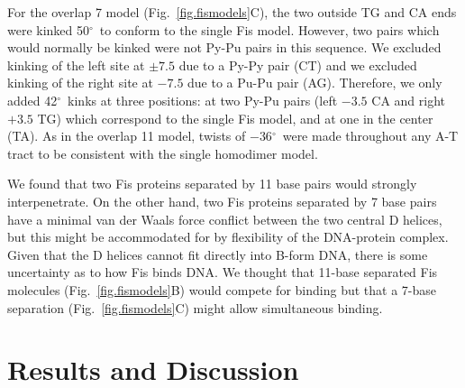 \documentclass[doublespacing]{narfront}
\newcommand{\fig}[1]{Fig.~\ref{#1}} %
\newcommand{\degrees}{${}^{\circ}$}
\newcommand{\latex}[1]{#1} %
\newcommand{\html}[1]{{ }} %
\begin{document}

For the overlap 7 model
\html{(figure 3),}%
\latex{(\fig{fig.fismodels}C),}
the two outside TG and CA ends were kinked
50\degrees\ to conform to the single Fis model.  However, two pairs which would
normally be kinked were not Py-Pu pairs in this sequence.  We excluded kinking
of the left site at $\pm 7.5$ due to a Py-Py pair (CT) and we excluded kinking of
the right site at $-7.5$ due to a Pu-Pu pair (AG).
Therefore, we only added
42\degrees\ kinks at three positions: at two Py-Pu pairs (left $-3.5$ CA and
right $+3.5$ TG) which correspond to the single Fis model, and
at one in the center (TA).
As in the overlap 11 model,
twists of $-36$\degrees\ were made throughout any A-T tract
to be consistent with the single homodimer model.


We found that two Fis
proteins separated by 11 base pairs would strongly interpenetrate.
On the other hand, two Fis proteins separated by 7 base pairs have a
minimal van der Waals force conflict between the two central D helices,
but this might be accommodated for by flexibility
of the DNA-protein complex.
Given that the D helices cannot fit directly into B-form DNA,
there is some uncertainty as to how Fis binds DNA.
We thought
that 11-base separated Fis
molecules
\html{(figure 2)}%
\latex{(\fig{fig.fismodels}B)}
would compete for binding but that a 7-base separation
\html{(figure 3)}%
\latex{(\fig{fig.fismodels}C)}
might allow
simultaneous binding.


\section*{Results and Discussion}
\end{document}
